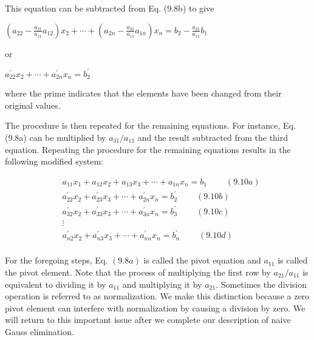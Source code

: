 \documentclass[../main.tex]{subfiles}
\begin{document}
This equation can be subtracted from Eq. (9.8b) to give \bigskip

$\left(a_{22}-\frac{a_{21}}{a_{11}} a_{12}\right) x_{2}+\cdots+\left(a_{2 n}-\frac{a_{21}}{a_{11}} a_{1 n}\right) x_{n}=b_{2}-\frac{a_{21}}{a_{11}} b_{1} $ \bigskip

or\bigskip

$a_{22}^{\prime} x_{2}+\cdots+a_{2 n}^{\prime} x_{n}=b_{2}^{\prime}$\bigskip

\noindent where the prime indicates that the elements have been changed from their original values.

The procedure is then repeated for the remaining equations. For instance, Eq. (9.8a) can be multiplied by $a_{31} / a_{11}$ and the result subtracted from the third equation. Repeating the procedure for the remaining equations results in the following modified system:


$$
\begin{aligned}
&a_{11} x_{1}+a_{12} x_{2}+a_{13} x_{3}+\cdots+a_{1 n} x_{n}=b_{1} \ \ \ \ \ \ \ \ \ \ (9.10a)\\
&a_{22}^{\prime} x_{2}+a_{23}^{\prime} x_{3}+\cdots+a_{2 n}^{\prime} x_{n}=b_{2}^{\prime} \ \ \ \ \ \ \ \ \ \ (9.10b)\\
&a_{32}^{\prime} x_{2}+a_{33}^{\prime} x_{3}+\cdots+a_{3 n}^{\prime} x_{n}=b_{3}^{\prime} \ \ \ \ \ \ \ \ \ \ (9.10c)\\
&\vdots \\
&a_{n 2}^{\prime} x_{2}+a_{n 3}^{\prime} x_{3}+\cdots+a_{n n}^{\prime} x_{n}=b_{n}^{\prime} \ \ \ \ \ \ \ \ \ \ (9.10d)\\
\end{aligned}
$$

For the foregoing steps, Eq. $(9.8 a)$ is called the pivot equation and $a_{11}$ is called the pivot element. Note that the process of multiplying the first row by $a_{21} / a_{11}$ is equivalent to dividing it by $a_{11}$ and multiplying it by $a_{21}$. Sometimes the division operation is referred to as normalization. We make this distinction because a zero pivot element can interfere with normalization by causing a division by zero. We will return to this important issue after we complete our description of naive Gauss elimination.
\end{document}

